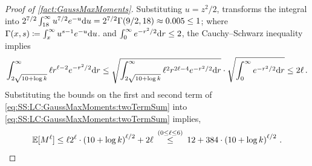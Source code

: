 \documentclass[11pt,letterpaper]{article}
\theoremstyle{plain}
\theoremstyle{definition}
\theoremstyle{remark}
\newcommand{\Stackrel}[2]{\stackrel{\mathmakebox[\widthof{\ensuremath{#2}}]{#1}}{#2}}
\newcommand{\inparen}[1]{\ensuremath{\left(#1\right)}}
\newcommand{\E}{\operatornamewithlimits{\mathbb{E}}}
\newcommand{\Ex}{\E}
\renewcommand{\d}{{\rm d}}
\begin{document}
{{\begin{proof}[Proof of \cref{fact:GaussMaxMoments}]
{        Substituting $u=z^2/2$, transforms the integral into $2^{7/2}\int_{18}^\infty u^{7/2} e^{-u} \d u = 2^{7/2}\Gamma(9/2,18)\approx 0.005 \le 1$; where $\Gamma(x,s)\coloneqq \int_{x}^\infty u^{s-1} e^{-u}\d u$.} and $\int_0^\infty e^{-r^2/2} \d r\leq 2$,
        the Cauchy--Schwarz inequality implies 
        \begin{align*}
            \int_{2\sqrt{10+\log{k}}}^\infty \ell r^{\ell-2} e^{-r^2/2}\d r
            \leq 
            \sqrt{\int_{2\sqrt{10+\log{k}}}^\infty \ell^2 r^{2\ell-4} e^{-
            r^2/2}\d r}
            \cdot 
            \sqrt{\int_{0}^\infty e^{-r^2/2}\d r}
            \leq 2\ell\,.
        \end{align*}
        Substituting the bounds on the first and second term of \cref{eq:SS:LC:GaussMaxMoments:twoTermSum} into \cref{eq:SS:LC:GaussMaxMoments:twoTermSum} implies,
        \[
            \Ex[M^\ell]
            \leq 
            \ell 2^\ell \cdot \inparen{10+\log{k}}^{\ell/2}
            + 2\ell
            ~~~~\Stackrel{(0\leq \ell\leq 6)}{\leq}~~~~
                12 + 384\cdot \inparen{10+\log{k}}^{\ell/2}
            \,.
        \]
    \end{proof}
    
}}
\end{document}
